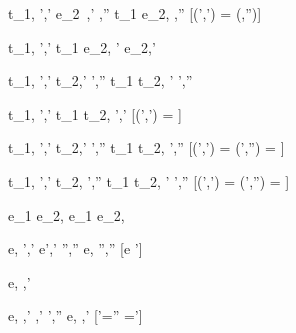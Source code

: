   {t_1,\hat{\sigma} \hat{\stride} ',\hat{\sigma}'  \Quad
   e_2\ ,\hat{\sigma}' \hat{\eval} ,\hat{\sigma}''}
  {t_1 \Then e_2,\hat{\sigma} \hat{\stride} ,\hat{\sigma}''}
  [\Value(',\hat{\sigma}') =  \land \lnot\Failing(,\hat{\sigma}'')]

  {t_1,\hat{\sigma} \hat{\stride} ',\hat{\sigma}'}
  {t_1 \Next e_2,\hat{\sigma} \hat{\stride} ' \Next e_2,\hat{\sigma}'}


  {t_1,\hat{\sigma}  \hat{\stride} ',\hat{\sigma}'  \Quad
   t_2,\hat{\sigma}' \hat{\stride} ',\hat{\sigma}''}
  {t_1 \And t_2,\hat{\sigma} \hat{\stride} ' \And {}',\hat{\sigma}''}


  {t_1,\hat{\sigma}  \hat{\stride} ',\hat{\sigma}'}
  {t_1 \Or t_2,\hat{\sigma} \hat{\stride} ',\hat{\sigma}'}
  [\Value(',\hat{\sigma}') = ]

  {t_1,\hat{\sigma}  \hat{\stride} ',\hat{\sigma}'  \Quad
   t_2,\hat{\sigma}' \hat{\stride} ',\hat{\sigma}''}
  {t_1 \Or t_2,\hat{\sigma} \hat{\stride} ',\hat{\sigma}''}
  [\Value(',\hat{\sigma}') = \bot \land \Value(',\hat{\sigma}'') = ]

  {t_1,\hat{\sigma}  \hat{\stride }',\hat{\sigma}'  \Quad
   t_2,\hat{\stride} ',\hat{\sigma}''}
  {t_1 \Or t_2,\hat{\sigma} \hat{\stride} ' \Or {}',\hat{\sigma}''}
  [\Value(',\hat{\sigma}') = \bot \land \Value(',\hat{\sigma}'') = \bot]


  { }
  {e_1 \Xor e_2,\hat{\sigma} \hat{\stride} e_1 \Xor e_2,\hat{\sigma}}

    {e,\hat{\sigma} \hat{\eval} ',\hat{\sigma}'  \Quad
     e',\hat{\sigma}' \hat{\stride} '',\hat{\sigma}''}
    {e,\hat{\sigma} \hat{\stride} '',\hat{\sigma}''}
    [e \neq {}']



  {e,\hat{\sigma} \hat{\normalise} ,\hat{\sigma}'}


    {e,\hat{\sigma} \hat{\eval} ,\hat{\sigma}' \Quad
     ,\hat{\sigma}' \hat{\stride} ',\hat{\sigma}''}
    {e,\hat{\sigma} \hat{\normalise} ,\hat{\sigma}'}
    [\hat{\sigma}'=\hat{\sigma}'' \land {}=']

